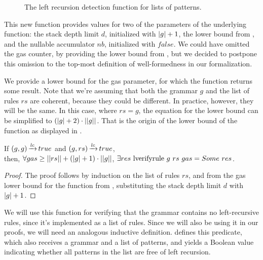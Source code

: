 \begin{figure}
    \centering
    
    \caption{The left recursion detection function for lists of patterns.}
    \label{fig:lverifyrule-function}
\end{figure}

This new function provides values
for two of the parameters of the underlying function:
the stack depth limit $d$, initialized with $|g|+1$,
the lower bound from ,
and the nullable accumulator $nb$, initialized with $false$.
We could have omitted the gas counter,
by providing the lower bound from ,
but we decided to postpone
this omission to the top-most definition
of well-formedness in our formalization.

We provide a lower bound for the gas parameter,
for which the function returns some result.
Note that we're assuming that both the grammar $g$
and the list of rules $rs$ are coherent,
because they could be different.
In practice, however,
they will be the same.
In this case,
where $rs = g$,
the equation for the lower bound can be simplified
to $(|g| + 2) \cdot ||g||$.
That is the origin of the lower bound of the
\textit{\verifygrammarname{}} function
as displayed in .

\begin{lemma}%
    If $(g,g) \operatorname{\xrightarrow{\mathit{lc}}} true$ and $(g,rs) \operatorname{\xrightarrow{\mathit{lc}}} true$, \\
    then, $\forall gas \ge ||rs|| + (|g| + 1) \cdot ||g||$,
    $\exists res\ \lverifyrulecomp{g}{rs}{gas} = \Some res$.
\end{lemma}

\begin{proof}
    The proof follows by induction on the list of rules $rs$,
    and from the gas lower bound for the function \textit{\verifyrulename{}}
    from ,
    substituting the stack depth limit $d$ with $|g|+1$.
\end{proof}

We will use this function for
verifying that the grammar contains
no left-recursive rules,
since it's implemented as a list of rules.
Since we will also be using it in our proofs,
we will need an analogous inductive definition.
 defines this predicate,
which also receives a grammar and a list of patterns,
and yields a Boolean value indicating
whether all patterns in the list are free of left recursion.

